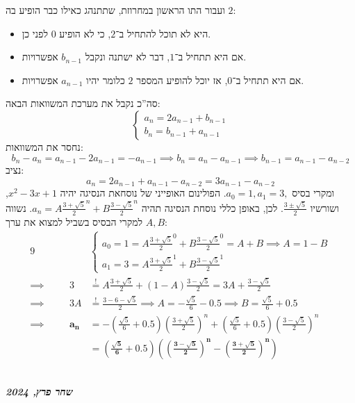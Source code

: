 \documentclass[]{article}
\newcommand\sen   {\selectlanguage{english}}
\newcommand\she   {\selectlanguage{hebrew}}
\newcommand\ndoc  {\quad \sen \dotfill \she \\ \vfil \hfil \textbf{\textit{שחר פרץ, 2024}} \hfil \vfil}
\newcommand\seq   {\overset{!}{=}}
\newcommand\cl [1]    {\left ( #1 \right )}
\begin{document}
	ועבור התו הראשון במחרוזת, שתתנהג כאילו כבר הופיע בה $2$: 
	\begin{itemize}
		\item היא לא תוכל להתחיל ב־$2$, כי לא הופיע $0$ לפני כן. 
		\item אם היא תתחיל ב־$1$, דבר לא ישתנה ונקבל $b_{n - 1}$ אפשרויות. 
		\item אם היא תתחיל ב־$0$, אז יוכל להופיע המספר $2$ כלומר יהיו $a_{n - 1}$ אפשרויות. 
	\end{itemize}
	
	סה''כ נקבל את מערכת המשוואות הבאה: 
	\[ \begin{cases}
		a_n = 2a_{n - 1} + b_{n - 1} \\
		b_n = b_{n - 1} + a_{n - 1}
	\end{cases} \]
	נחסר את המשוואות: 
	\[ b_n - a_n = a_{n - 1} - 2a_{n - 1} = -a_{n - 1} \implies b_n = a_n - a_{n - 1} \implies b_{n - 1} = a_{n - 1} - a_{n - 2} \]
	נציב: 
	\[ a_n = 2a_{n - 1} + a_{n - 1} - a_{n - 2} =3a_{n - 1} - a_{n - 2} \]
	ומקרי בסיס $a_0 = 1, a_1 = 3, $. הפולינום האופייני של נוסחאת הנסיגה יהיה $x^2 - 3x + 1 $, ושורשיו $\frac{3 \pm \sqrt5}{2}$. לכן, באופן כללי נוסחת הנסיגה תהיה $a_n = A\frac{3 + \sqrt5}{2}^{n} + B\frac{3 - \sqrt5}{2}^{n}$. נשווה למקרי הבסיס בשביל למצוא את ערך $A, B$: 
	\begin{alignat*}{9}
		&&&\begin{cases}
			a_0 = 1 = A\frac{3 + \sqrt5}{2}^{0} + B\frac{3 - \sqrt5}{2}^{0} = A + B \implies A = 1 - B\\
			a_1 = 3 = A\frac{3 + \sqrt5}{2}^{1} + B\frac{3 - \sqrt5}{2}^{1}
		\end{cases} \\
		\implies \quad &&3  &\seq A\frac{3 + \sqrt5}{2} + (1 - A)\frac{3 - \sqrt5}{2} = 3A + \frac{3 - \sqrt5}{2} \\
		\implies \quad &&3A &\seq \frac{3 - 6 - \sqrt{5}}{2} \implies A = -\frac{\sqrt5}{6} -0.5 \implies B = \frac{\sqrt5}{6} + 0.5 \\
		\implies \quad &&\bm{a_n} &= -\left (\frac{\sqrt5}{6} + 0.5\right )\cl{\frac{3 + \sqrt5}{2}}^{n} + \left  (\frac{\sqrt5}{6} + 0.5 \right  )\cl{\frac{3 - \sqrt5}{2}}^{n} \\
		         \quad &&         &= \bm{\cl{\frac{\sqrt5}{6} + 0.5}\cl{\cl{\frac{3 - \sqrt 5}{2}}^n - \cl{\frac{3 + \sqrt5}{2}}^n}}
	\end{alignat*}
	
	
	\ndoc
	
\end{document}
